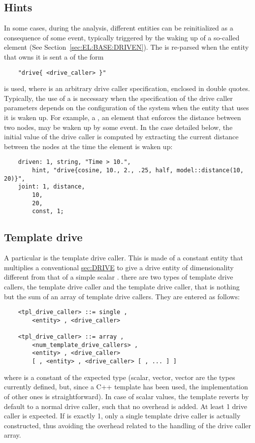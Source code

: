 \subsection{Hints}\label{sec:GENERAL:DRIVE:HINT}
In some cases, during the analysis, different entities can be reinitialized
as a consequence of some event, typically triggered by the waking up 
of a so-called  element (See Section~\ref{sec:EL:BASE:DRIVEN}).
The  is re-parsed when the entity that owns it is sent
a  of the form
\begin{verbatim}
    "drive{ <drive_caller> }"
\end{verbatim}
is used, where  is an arbitrary drive caller specification,
enclosed in double quotes.
Typically, the use of a  is necessary when the specification of the
drive caller parameters depends on the configuration of the system when the
entity that uses it is waken up.
For example, a , an element that enforces the distance
between two nodes, may be waken up by some event.
In the case detailed below, the initial value of the  drive caller
is computed by extracting the current distance between the nodes at the time
the element is waken up:
\begin{verbatim}
    driven: 1, string, "Time > 10.",
        hint, "drive{cosine, 10., 2., .25, half, model::distance(10, 20)}",
    joint: 1, distance,
        10,
        20,
        const, 1;
\end{verbatim}



\subsection{Template drive}\label{sec:TPL-DRIVE}
A particular  is the template drive caller. This is made
of a constant entity that multiplies a conventional 
\hyperref{\kw{drive}}{\kw{drive} (see Section~}{)}{sec:DRIVE} to give a drive
entity of dimensionality different from that of a simple scalar .
there are two types of template drive callers, the  template 
drive caller and the  template drive caller, 
that is nothing but the sum of an array of 
template drive callers. 
They are entered as follows:
\begin{verbatim}
    <tpl_drive_caller> ::= single ,
        <entity> , <drive_caller> 

    <tpl_drive_caller> ::= array ,
        <num_template_drive_callers> ,
        <entity> , <drive_caller>
        [ , <entity> , <drive_caller> [ , ... ] ]
\end{verbatim}
where  is a constant of the expected type (scalar,  
vector,  vector are the types currently defined, but, since 
a C++ template has been used, the implementation of other ones 
is straightforward).
In case of scalar values, the template reverts by default to a normal 
drive caller, such that no overhead is added.
At least 1 drive caller is expected. 
If  is exactly 1, only a single
template drive caller is actually constructed, thus avoiding the overhead 
related to the handling of the drive caller array.    

